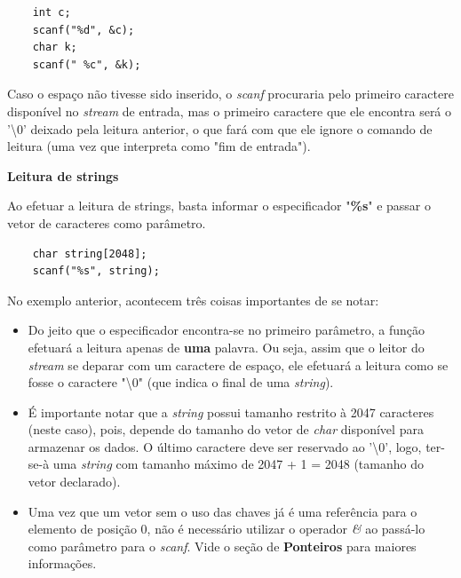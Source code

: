 \documentclass[12pt]{article}
\newcommand\tab[1][1cm]{\hspace*{#1}}
\begin{document}
\hspace{0.25cm}
\begin{lstlisting}
    int c;
    scanf("%d", &c);
    char k;
    scanf(" %c", &k);
\end{lstlisting}

\par\tab Caso o espaço não tivesse sido inserido, o \textit{scanf} procuraria pelo primeiro caractere disponível no \textit{stream} de entrada, mas o primeiro caractere que ele encontra será o '\textbackslash 0' deixado pela leitura anterior, o que fará com que ele ignore o comando de leitura (uma vez que interpreta como "fim de entrada").

\par\tab\textbf{Leitura de strings}

\par\tab Ao efetuar a leitura de strings, basta informar o especificador "\textbf{\%s}" e passar o vetor de caracteres como parâmetro.

\hspace{0.25cm}
\begin{lstlisting}
    char string[2048];
    scanf("%s", string);
\end{lstlisting}

\hspace{0.25cm}
\begin{tcolorbox}[colback=yellow!5!white,colframe=yellow!75!black,title=Atenção!]
  \par\tab No exemplo anterior, acontecem três coisas importantes de se notar:
  \begin{itemize}
      \item Do jeito que o especificador encontra-se no primeiro parâmetro, a função efetuará a leitura apenas de \textbf{uma} palavra. Ou seja, assim que o leitor do \textit{stream} se deparar com um caractere de espaço, ele efetuará a leitura como se fosse o caractere "\textbackslash 0" (que indica o final de uma \textit{string}).
      \item É importante notar que a \textit{string} possui tamanho restrito à 2047 caracteres (neste caso), pois, depende do tamanho do vetor de \textit{char} disponível para armazenar os dados. O último caractere deve ser reservado ao '\textbackslash 0', logo, ter-se-à uma \textit{string} com tamanho máximo de 2047 + 1 = 2048 (tamanho do vetor declarado).
      \item Uma vez que um vetor sem o uso das chaves já é uma referência para o elemento de posição 0, não é necessário utilizar o operador \textit{\&} ao passá-lo como parâmetro para o \textit{scanf}. Vide o seção de \textbf{Ponteiros} para maiores informações.
  \end{itemize}
\end{tcolorbox}
\end{document}
